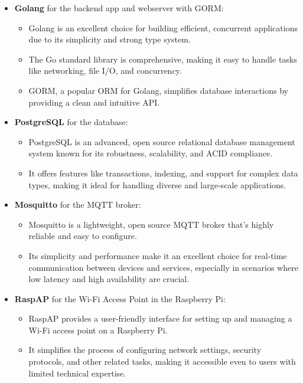 \documentclass{report}
\begin{document}
\begin{itemize}
    \item \textbf{Golang} for the backend app and webserver with GORM:
        \begin{itemize}
        \item Golang is an excellent choice for building efficient, concurrent applications due to its simplicity and strong type system.
        \item The Go standard library is comprehensive, making it easy to handle tasks like networking, file I/O, and concurrency.
        \item GORM, a popular ORM for Golang, simplifies database interactions by providing a clean and intuitive API.
        \end{itemize}

    \item \textbf{PostgreSQL} for the database:
        \begin{itemize}
        \item PostgreSQL is an advanced, open source relational database management system known for its robustness, scalability, and ACID compliance.
        \item It offers features like transactions, indexing, and support for complex data types, making it ideal for handling diverse and large-scale applications.
        \end{itemize}

    \item \textbf{Mosquitto} for the MQTT broker:
        \begin{itemize}
        \item Mosquitto is a lightweight, open source MQTT broker that's highly reliable and easy to configure.
        \item Its simplicity and performance make it an excellent choice for real-time communication between devices and services, especially in scenarios where low latency and high availability are crucial.
        \end{itemize}

    \item \textbf{RaspAP} for the Wi-Fi Access Point in the Raspberry Pi:
        \begin{itemize}
        \item RaspAP provides a user-friendly interface for setting up and managing a Wi-Fi access point on a Raspberry Pi.
        \item It simplifies the process of configuring network settings, security protocols, and other related tasks, making it accessible even to users with limited technical expertise.
        \end{itemize}


\end{itemize}
\end{document}
